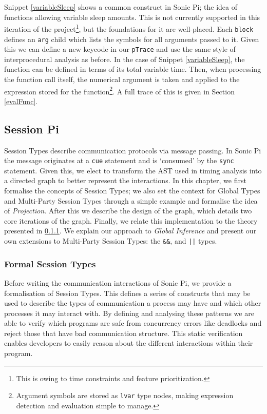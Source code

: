 \documentclass[11pt, abstracton, twoside, titlepage=true]{scrartcl}
\begin{document}
Snippet \ref{variableSleep} shows a common construct in Sonic Pi; the idea of 
functions allowing variable sleep amounts. This is not currently supported in this 
iteration of the project\footnote{This is owing to time constraints and feature prioritization.}, but the foundations for it are well-placed. Each 
\texttt{block} defines an \texttt{arg} child which lists the symbols for all 
arguments passed to it. Given this we can define a new keycode in our \texttt{pTrace}
and use the same style of interprocedural analysis as before. In the case of Snippet 
\ref{variableSleep}, the function can be defined in terms of its total variable time.
Then, when processing the function call itself, the numerical argument is taken and 
applied to the expression stored for the function\footnote{Argument symbols are 
stored as \texttt{lvar} type nodes, making expression detection and evaluation 
simple to manage.}. A full trace of this is given in Section \ref{evalFunc}.

\subsection{Session Pi} \label{sessionPi}
Session Types describe communication protocols via message passing. In Sonic Pi
the message originates at a \texttt{cue} statement and is `consumed' by the
\texttt{sync} statement. Given this, we elect to transform the AST used in
timing analysis into a directed graph to better represent the interactions. In this 
chapter, we first formalise the concepts of Session Types; we also set the 
context for Global Types and Multi-Party Session Types through a simple example and 
formalise the idea of \emph{Projection}. After this we describe the design of the 
graph, which details two core iterations of the graph. Finally, we relate 
this implementation to the theory presented in \ref{formalST}. We explain our 
approach to \emph{Global Inference} and present our own extensions to Multi-Party 
Session Types: the \texttt{\&\&}, and \texttt{||} types.

\subsubsection{Formal Session Types} \label{formalST}
Before writing the communication interactions of Sonic Pi, we provide a formalisation 
of Session Types. This defines a series of constructs that may be used to describe 
the types of communication a process may have and which other processes it may 
interact with. By defining and analysing these patterns we are able to verify which 
programs are safe from concurrency errors like deadlocks and reject those that have 
bad communication structure. This static verification enables developers to easily 
reason about the different interactions within their program.
\end{document}
